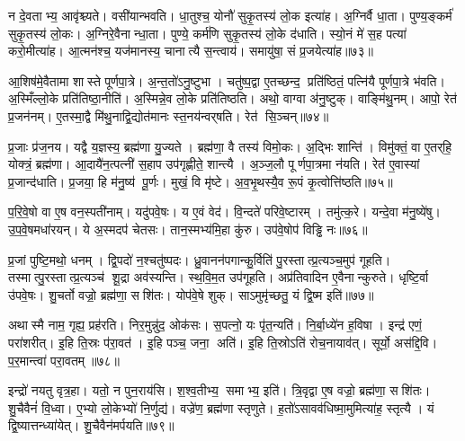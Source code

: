 न दे॒वताभ्य॒ आवृ॑श्च्यते।
वसी॑यान्भवति।
धा॒तुश्च॒ योनौ॑ सुकृ॒तस्य॑ लो॒क इत्या॑ह।
अ॒ग्निर्वै धा॒ता।
पुण्य॒ङ्कर्म॑ सुकृ॒तस्य॑ लो॒कः।
अ॒ग्निरे॒वैनान्धा॒ता।
पुण्ये॒ कर्म॑णि सुकृ॒तस्य॑ लो॒के द॑धाति।
स्यो॒नं मे॑ स॒ह पत्या॑ करो॒मीत्या॑ह।
आ॒त्मन॑श्च॒ यज॑मानस्य॒ चानात्यै स॒न्त्वाय॑।
समायु॑षा॒ सं प्र॒जयेत्या॑ह॥७३॥

आ॒शिष॑मे॒वैतामा शास्ते पूर्णपा॒त्रे।
अ॒न्त॒तो॑ऽनु॒ष्टुभा।
चतु॑ष्प॒द्वा ए॒तच्छन्द॒ प्रति॑ष्ठितं॒ पत्नि॑यै पूर्णपा॒त्रे भ॑वति।
अ॒स्मिँल्लो॒के प्रति॑तिष्ठा॒नीति॑।
अ॒स्मिन्ने॒व लो॒के प्रति॑तिष्ठति।
अथो॒ वाग्वा अ॑नु॒ष्टुक्।
वाङ्मि॑थु॒नम्।
आपो॒ रेत॑ प्र॒जन॑नम्।
ए॒तस्मा॒द्वै मि॑थु॒नाद्वि॒द्योत॑मानः स्त॒नय॑न्वर्‌षति।
रेत॑ सि॒ञ्चन्॥७४॥

प्र॒जाः प्र॑ज॒नय\sn{}।
यद्वै य॒ज्ञस्य॒ ब्रह्म॑णा यु॒ज्यते।
ब्रह्म॑णा॒ वै तस्य॑ विमो॒कः।
अ॒द्भिः शान्ति॑।
विमु॑क्तं॒ वा ए॒तर्‌हि॒ योक्त्रं॒ ब्रह्म॑णा।
आ॒दायै॑न॒त्पत्नी॑ स॒हाप उप॑गृह्णीते॒ शान्त्यै।
अ॒ञ्ज॒लौ पूर्णपा॒त्रमा न॑यति।
रेत॑ ए॒वास्यां प्र॒जान्द॑धाति।
प्र॒जया॒ हि म॑नु॒ष्य॑ पू॒र्णः।
मुखं॒ वि मृ॑ष्टे।
अ॒व॒भृ॒थस्यै॒व रू॒पं कृ॒त्वोत्ति॑ष्ठति॥७५॥\anuvakamend[स॒वि॒तृप्र॑सूतो यथादेव॒तं प्र॒जयेत्या॑ह सि॒ञ्चन्मृ॑ष्ट॒ एकं च]

प॒रि॒वे॒षो वा ए॒ष वन॒स्पती॑नाम्।
यदु॑पवे॒षः।
य ए॒वं वेद॑।
वि॒न्दते॑ परिवे॒ष्टारम्।
तमु॑त्क॒रे।
यन्दे॒वा म॑नु॒ष्ये॑षु।
उ॒प॒वे॒षमधा॑रयन्।
ये अ॒स्मदप॑ चेतसः।
तान॒स्मभ्य॑मि॒हा कु॑रु।
उप॑वे॒षोप॑ विड्ढि नः॥७६॥

प्र॒जां पुष्टि॒मथो॒ धनम्।
द्वि॒पदो॑ न॒श्चतु॑ष्पदः।
ध्रु॒वानन॑पगान्कु॒र्विति॑ पु॒रस्तात्प्र॒त्यञ्च॒मुप॑ गूहति।
तस्मात्पु॒रस्तात्प्र॒त्यञ्च॑ शू॒द्रा अव॑स्यन्ति।
स्थ॒वि॒म॒त उप॑गूहति।
अप्र॑तिवादिन ए॒वैनान्कुरुते।
धृष्टि॒र्वा उ॑पवे॒षः।
शु॒चर्तो वज्रो॒ ब्रह्म॑णा॒ सशि॑तः।
योप॑वे॒षे शुक्।
साऽमुमृ॑च्छतु॒ यं द्वि॒ष्म इति॑॥७७॥

अथास्मै नाम॒ गृह्य॒ प्रह॑रति।
निर॒मुन्नु॑द॒ ओक॑सः।
स॒पत्नो॒ यः पृ॑त॒न्यति॑।
नि॒र्बा॒ध्ये॑न ह॒विषा।
इन्द्र॑ एणं॒ परा॑शरीत्।
इ॒हि ति॒स्रः प॑रा॒वत॑।
इ॒हि पञ्च॒ जना॒ अति॑।
इ॒हि ति॒स्रोऽति॑ रोच॒नायाव॑त्।
सूर्यो॒ अस॑द्दि॒वि।
प॒र॒मान्त्वा॑ परा॒वतम्॥७८॥

इन्द्रो॑ नयतु वृत्र॒हा।
यतो॒ न पुन॒राय॑सि।
श॒श्व॒तीभ्य॒ समाभ्य॒ इति॑।
त्रि॒वृद्वा ए॒ष वज्रो॒ ब्रह्म॑णा॒ सशि॑तः।
शु॒चैवैनं॑ वि॒ध्वा।
ए॒भ्यो लो॒केभ्यो॑ नि॒र्णुद्य॑।
वज्रे॑ण॒ ब्रह्म॑णा स्तृणुते।
ह॒तो॑ऽसावव॑धिष्मा॒मुमित्या॑ह॒ स्तृत्यै।
यं द्वि॒ष्यात्तन्ध्या॑येत्।
शु॒चैवैन॑मर्पयति॥७९॥




\clearpage
{}
\setcounter{anuvakam}{0}

